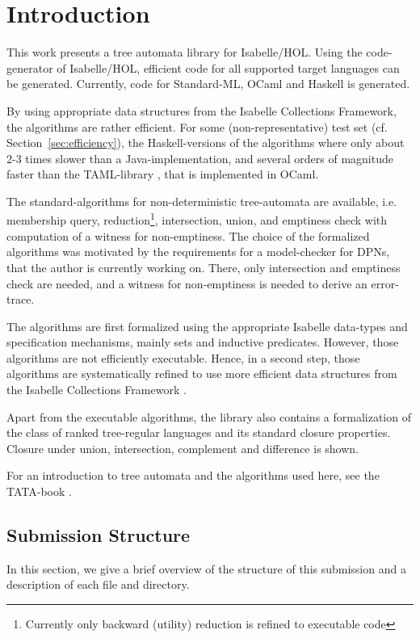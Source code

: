 \section{Introduction}\label{sec:intro}
This work presents a tree automata library for Isabelle/HOL.
Using the code-generator of Isabelle/HOL, efficient code for all supported target languages
can be generated. Currently, code for Standard-ML, OCaml and Haskell is generated.

By using appropriate data structures from the Isabelle Collections Framework\cite{L09_collections}, the algorithms are rather efficient. For some (non-representative) test set (cf. Section~\ref{sec:efficiency}), the Haskell-versions of the algorithms where only about 2-3 times slower than a Java-implementation, and several orders of magnitude faster than the TAML-library \cite{TIMBUK}, that is implemented in OCaml.

The standard-algorithms for non-deterministic tree-automata are available, i.e. membership query, reduction\footnote{Currently only backward (utility) reduction is refined to executable code}, intersection, union, and emptiness check with computation of a witness for non-emptiness.
The choice of the formalized algorithms was motivated by the requirements for a model-checker for DPNs\cite{BMT05}, that the author is currently working on\cite{L09_kps}. There, only intersection and emptiness check are needed, and a witness for non-emptiness is needed to derive an error-trace.

The algorithms are first formalized using the appropriate Isabelle data-types and specification mechanisms, mainly sets and inductive predicates. However, those algorithms are not efficiently executable. Hence, in a second step, those algorithms are systematically refined to use more efficient data structures from the Isabelle Collections Framework \cite{L09_collections}.

Apart from the executable algorithms, the library also contains a formalization of the class of ranked tree-regular languages and its standard closure properties. Closure under union, intersection, complement and difference is shown.

For an introduction to tree automata and the algorithms used here, see the TATA-book \cite{tata2007}.

\subsection{Submission Structure}
In this section, we give a brief overview of the structure of this submission and a description of each file and directory.
